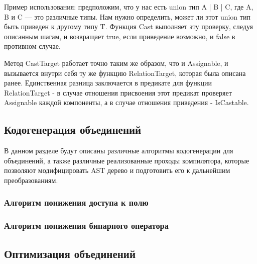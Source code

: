 Пример использования:
предположим, что у нас есть union тип A | B | C, где A, B и C — это различные типы.
Нам нужно определить, может ли этот union тип быть приведен к другому типу T.
Функция Cast выполняет эту проверку, следуя описанным шагам, и возвращает true, если приведение возможно, и
false в противном случае.

Метод CastTarget работает точно таким же образом, что и Assignable, и вызывается внутри себя ту же функцию RelationTarget,
которая была описана ранее.
Единственная разница заключается в предикате для функции RelationTarget - в случае отношения присвоения этот предикат
проверяет Assignable каждой компоненты, а в случае отношения приведения - IsCastable.

\subsection{Кодогенерация объединений}

В данном разделе будут описаны различные алгоритмы кодогенерации для объединений, а также различные реализованные
проходы компилятора, которые позволяют модифицировать AST дерево и подготовить его к дальнейшим преобразованиям.

\subsubsection{Алгоритм понижения доступа к полю}

\subsubsection{Алгоритм понижения бинарного оператора}

\subsection{Оптимизация объединений}


\newpage
